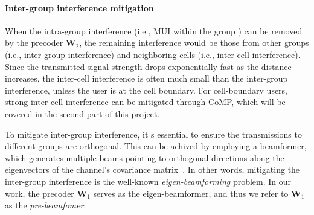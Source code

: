 \documentclass[a4paper,12pt]{article}%
\begin{document}
\paragraph{Inter-group interference mitigation}

When the intra-group interference (i.e., MUI within the group ) can be removed by the precoder $\mathbf{W}_2$, the remaining interference would be those from other groups (i.e., inter-group interference) and neighboring cells (i.e., inter-cell interference). Since the transmitted signal strength drops exponentially fast as the distance increases, the inter-cell interference is often much small than the inter-group interference, unless the user is at the cell boundary. For cell-boundary users, strong inter-cell interference can be mitigated through CoMP, which will be covered in the second part of this project.

To mitigate inter-group interference, it s essential to ensure the transmissions to different groups are orthogonal. This can be achived by employing a beamformer, which generates multiple beams pointing to orthogonal directions along the eigenvectors of the channel's covariance matrix~\cite{Zhou2003}. In other words, mitigating the inter-group interference is the well-known \emph{eigen-beamforming} problem. In our work, the precoder $\mathbf{W}_1$ serves as the eigen-beamformer, and thus we refer to $\mathbf{W}_1$ as the \emph{pre-beamfomer}.
\end{document}
